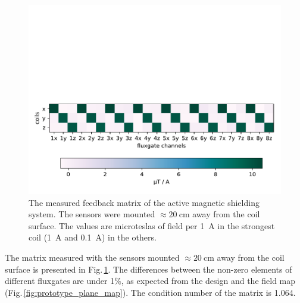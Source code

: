 \begin{figure}
  \centering
  \includegraphics[width=.9\linewidth]{gfx/prototype/SFC_matrix_green.pdf}
  \caption{The measured feedback matrix of the active magnetic shielding system. The sensors were mounted $\approx\SI{20}{\centi\meter}$ away from the coil surface. The values are microteslas of field per \SI{1}{\ampere} in the strongest coil (\SI{1}{\ampere} and \SI{0.1}{\ampere}) in the others.}\label{fig:prototype_feedback_matrix}
\end{figure}

The matrix measured with the sensors mounted $\approx\SI{20}{\centi\meter}$ away from the coil surface is presented in Fig.\,\ref{fig:prototype_feedback_matrix}. The differences between the non-zero elements of different fluxgates are under 1\%, as expected from the design and the field map (Fig.\,\ref{fig:prototype_plane_map}). The condition number of the matrix is \num{1.064}.




